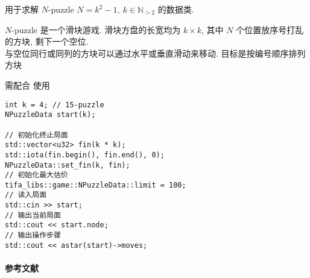 用于求解 \(N\)-puzzle \(N=k^2-1,~k\in\mathbb{N}_{>2}\) 的数据类.

\(N\)-puzzle 是一个滑块游戏. 滑块方盘的长宽均为 \(k\times k\), 其中 \(N\) 个位置放序号打乱的方块, 剩下一个空位. \\ 与空位同行或同列的方块可以通过水平或垂直滑动来移动. 目标是按编号顺序排列方块

需配合  使用

\begin{verbatim}
int k = 4; // 15-puzzle
NPuzzleData start(k);

// 初始化终止局面
std::vector<u32> fin(k * k);
std::iota(fin.begin(), fin.end(), 0);
NPuzzleData::set_fin(k, fin);
// 初始化最大估价
tifa_libs::game::NPuzzleData::limit = 100;
// 读入局面
std::cin >> start;
// 输出当前局面
std::cout << start.node;
// 输出操作步骤
std::cout << astar(start)->moves;
\end{verbatim}

\paragraph{参考文献} \cite{johnson1879notes} \cite{archer1999modern}